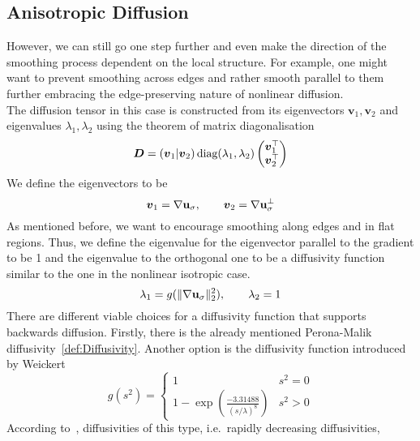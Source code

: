 \subsection{Anisotropic Diffusion}
However, we can still go one step further and even make the direction of the smoothing process dependent
on the local structure. For example, one might want to prevent smoothing across edges and rather
smooth parallel to them further embracing the edge-preserving nature of nonlinear diffusion.\\
The diffusion tensor in this case is constructed from its eigenvectors $\boldsymbol v_1,
\boldsymbol v_2$ and eigenvalues $\lambda_1, \lambda_2$ using the
theorem of matrix diagonalisation
\begin{equation}\label{eq:DiffTensor}
    \boldsymbol D = \left(\boldsymbol v_1\vert \boldsymbol v_2\right) \textnormal{diag}(\lambda_1, \lambda_2)
    \begin{pmatrix}
        \boldsymbol v_1^\top\\
        \boldsymbol v_2^\top
    \end{pmatrix}
\end{equation}
We define the eigenvectors to be
\begin{equation}
    \boldsymbol v_1 = \mathbf{\nabla} \mathbf{u}_\sigma,\qquad\boldsymbol v_2 = \mathbf{\nabla} \mathbf{u}_\sigma^\bot
\end{equation}
As mentioned before, we want to encourage smoothing along edges and in flat regions. Thus, we
define the eigenvalue for the eigenvector parallel to the gradient to be 1 and the eigenvalue to
the orthogonal one to be a diffusivity function similar to the one in the nonlinear isotropic case.
\begin{equation}
    \lambda_1 = g(\lVert\mathbf{\nabla} \mathbf{u}_\sigma\rVert_2^2),\qquad\lambda_2 = 1
\end{equation}
There are different viable choices for a diffusivity function that supports backwards diffusion.
Firstly, there is the already mentioned Perona-Malik diffusivity~\eqref{def:Diffusivity}. Another
option is the diffusivity function introduced by Weickert~\cite{weickert96}
\begin{equation}
    g(s^2) = \begin{cases}
        1 & s^2 = 0\\
        1 - \exp\left(\frac{-3.31488}{{(s/\lambda)}^8}\right) & s^2 > 0
    \end{cases}\label{def:WeickertDiff}
\end{equation}
According to~\cite{dic}, diffusivities of this type, i.e.\ rapidly decreasing diffusivities,
